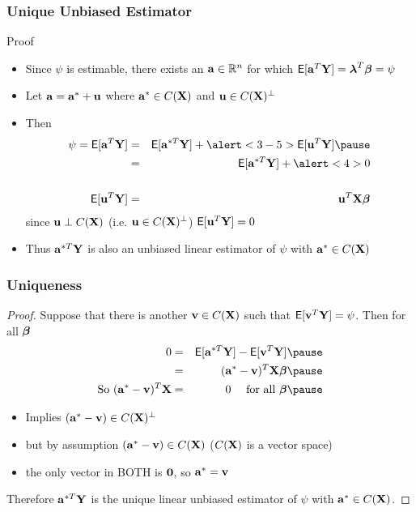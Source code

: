 \documentclass[handout]{beamer}
\begin{document}
  \begin{frame}
 \frametitle{Unique Unbiased Estimator}
  \begin{block}{Proof}
    \begin{itemize}
    \item     Since $\psi$ is estimable, there exists an $\mathbf{a} \in \mathbb{R}^n$ for
    which $\textsf{E}[\mathbf{a}^T\mathbf{Y}] = \boldsymbol{\lambda}^T\boldsymbol{\beta} = \psi$ \pause
\item Let $\mathbf{a} = \mathbf{a}^* + \mathbf{u}$ where $\mathbf{a}^* \in C(\mathbf{X})$ and $\mathbf{u} \in
  C(\mathbf{X})^\perp$ \pause
\item Then
  \begin{eqnarray*}
\psi  =   \E[\a^T\Y] &=& \E[\a^{*T}\Y] + \alert<3-5>{\E[\u^T\Y]} \pause\\    
     & = & \E[\a^{*T} \Y] + \alert<4>{0} \\
  &  & \\
\E[\u^T\Y] & = & \u^T\X \b
  \end{eqnarray*} 
since $\mathbf{u} \perp C(\mathbf{X})$ (i.e. $\mathbf{u} \in C(\mathbf{X})^\perp$) $\textsf{E}[\mathbf{u}^T\mathbf{Y}] = 0$ \pause

\item Thus $\mathbf{a}^{*T} \mathbf{Y}$ is also an unbiased linear estimator of $\psi$ with
  $\mathbf{a}^* \in C(\mathbf{X})$
    \end{itemize}

  \end{block}
\end{frame}
\begin{frame}
  \frametitle{Uniqueness}
  \begin{proof}
  Suppose that there is another $\mathbf{v} \in C(\mathbf{X})$ such that $\textsf{E}[\mathbf{v}^T\mathbf{Y}] =
  \psi$. Then for all $\boldsymbol{\beta}$ \pause
  \begin{eqnarray*}
    0 & = & \E[\a^{*T}\Y] - \E[\v^T\Y]  \pause \\
      & = & (\a^* - \v)^T \X \b \pause\\
\text{So  } (\a^* - \v)^T\X & = &  0 \quad \text{ for all } \b \pause
  \end{eqnarray*}

\begin{itemize}
\item Implies $(\mathbf{a}^* - \mathbf{v}) \in C(\mathbf{X})^\perp$ \pause
\item but by assumption $(\mathbf{a}^* - \mathbf{v}) \in C(\mathbf{X})$ \pause ($C(\mathbf{X})$ is a
  vector space) \pause
\item the only vector in BOTH is $\mathbf{0}$, so $\mathbf{a}^* = \mathbf{v}$ \pause
\end{itemize}
Therefore $\mathbf{a}^{*T}\mathbf{Y}$ is the unique linear unbiased estimator of $\psi$
with $\mathbf{a}^* \in C(\mathbf{X})$.
  \end{proof}

\end{frame}
\end{document}
